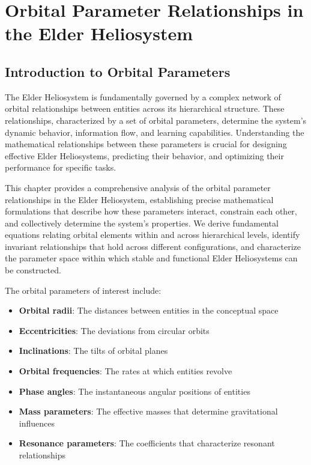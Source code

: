 \chapter{Orbital Parameter Relationships in the Elder Heliosystem}

\section{Introduction to Orbital Parameters}

The Elder Heliosystem is fundamentally governed by a complex network of orbital relationships between entities across its hierarchical structure. These relationships, characterized by a set of orbital parameters, determine the system's dynamic behavior, information flow, and learning capabilities. Understanding the mathematical relationships between these parameters is crucial for designing effective Elder Heliosystems, predicting their behavior, and optimizing their performance for specific tasks.

This chapter provides a comprehensive analysis of the orbital parameter relationships in the Elder Heliosystem, establishing precise mathematical formulations that describe how these parameters interact, constrain each other, and collectively determine the system's properties. We derive fundamental equations relating orbital elements within and across hierarchical levels, identify invariant relationships that hold across different configurations, and characterize the parameter space within which stable and functional Elder Heliosystems can be constructed.

The orbital parameters of interest include:

\begin{itemize}
    \item \textbf{Orbital radii}: The distances between entities in the conceptual space
    \item \textbf{Eccentricities}: The deviations from circular orbits
    \item \textbf{Inclinations}: The tilts of orbital planes
    \item \textbf{Orbital frequencies}: The rates at which entities revolve
    \item \textbf{Phase angles}: The instantaneous angular positions of entities
    \item \textbf{Mass parameters}: The effective masses that determine gravitational influences
    \item \textbf{Resonance parameters}: The coefficients that characterize resonant relationships
\end{itemize}

